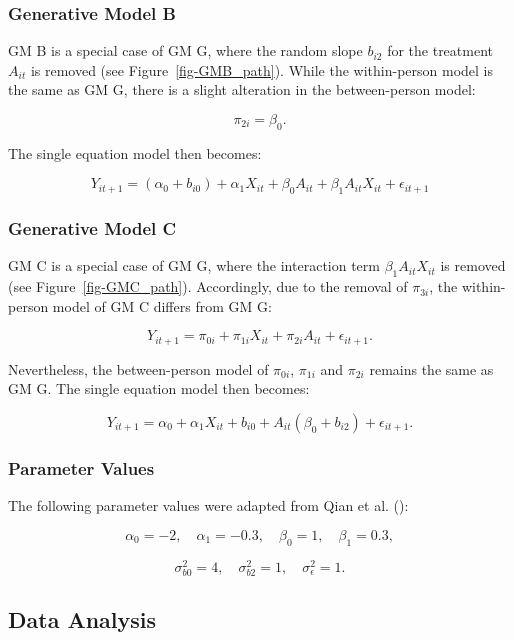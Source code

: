 \documentclass[
  11pt,
  a4paper,
]{article}
\begin{document}
\subsubsection{Generative Model B}\label{generative-model-b}

GM B is a special case of GM G, where the random slope \(b_{i2}\) for
the treatment \(A_{it}\) is removed (see Figure~\ref{fig-GMB_path}).
While the within-person model is the same as GM G, there is a slight
alteration in the between-person model:

\[ \pi_{2i} = \beta_0. \]

The single equation model then becomes:

\[
Y_{it+1} = (\alpha_0 + b_{i0}) + \alpha_1 X_{it} + \beta_0 A_{it} + \beta_1 A_{it} X_{it} + \epsilon_{it+1}
\]

\subsubsection{Generative Model C}\label{generative-model-c}

GM C is a special case of GM G, where the interaction term
\(\beta_1 A_{it} X_{it}\) is removed (see Figure~\ref{fig-GMC_path}).
Accordingly, due to the removal of \(\pi_{3i}\), the within-person model
of GM C differs from GM G:

\[Y_{it+1} = \pi_{0i} + \pi_{1i} X_{it} + \pi_{2i} A_{it} + \epsilon_{it+1}.\]

Nevertheless, the between-person model of \(\pi_{0i}\), \(\pi_{1i}\) and
\(\pi_{2i}\) remains the same as GM G. The single equation model then
becomes:

\[
Y_{it+1} = \alpha_0 + \alpha_1 X_{it} + b_{i0} + A_{it} (\beta_0 + b_{i2}) + \epsilon_{it+1}.
\]

\subsubsection{Parameter Values}\label{parameter-values}

The following parameter values were adapted from Qian et al.
():

\[
\alpha_0 = -2, \quad \alpha_1 = -0.3, \quad \beta_0 = 1, \quad \beta_1 = 0.3,
\]

\[
\sigma_{b0}^2 = 4, \quad \sigma_{b2}^2 = 1, \quad \sigma_\epsilon^2 = 1.
\]

\subsection{Data Analysis}\label{data-analysis}
\end{document}
